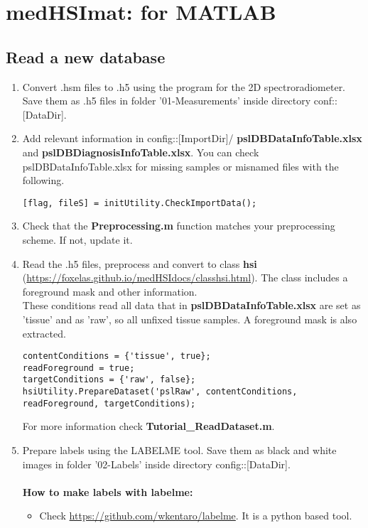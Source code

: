 \documentclass{foxelas_report}
\begin{document}
\section{medHSImat: for MATLAB}

\subsection{Read a new database}
\begin{enumerate}
\item Convert .hsm files to .h5 using the program for the 2D spectroradiometer. Save them as .h5 files in folder '01-Measurements' inside directory conf::[DataDir]. 


\item Add relevant information in config::[ImportDir]/ \textbf{pslDBDataInfoTable.xlsx} and \textbf{pslDBDiagnosisInfoTable.xlsx}. You can check pslDBDataInfoTable.xlsx for missing samples or misnamed files with the following. 
\begin{lstlisting}
[flag, fileS] = initUtility.CheckImportData();
\end{lstlisting}

\item Check that the \textbf{Preprocessing.m} function matches your preprocessing scheme. If not, update it. 


\item Read the .h5 files, preprocess and convert to class \textbf{hsi} (\url{https://foxelas.github.io/medHSIdocs/classhsi.html}). The class includes a foreground mask and other information. \\

These conditions read all data that in \textbf{pslDBDataInfoTable.xlsx} are set as 'tissue' and as 'raw', so all unfixed tissue samples. A foreground mask is also extracted. 

\begin{lstlisting}
contentConditions = {'tissue', true};
readForeground = true;
targetConditions = {'raw', false};
hsiUtility.PrepareDataset('pslRaw', contentConditions, readForeground, targetConditions);
\end{lstlisting}

For more information check \textbf{Tutorial\_ReadDataset.m}. 

\item Prepare labels using the LABELME tool. Save them as black and white images in folder '02-Labels' inside directory config::[DataDir]. \\
\\
\textbf{How to make labels with labelme: 
}\begin{itemize}
\item Check  \url{https://github.com/wkentaro/labelme}. It is a python based tool.


\end{itemize}
\end{enumerate}
\end{document}
